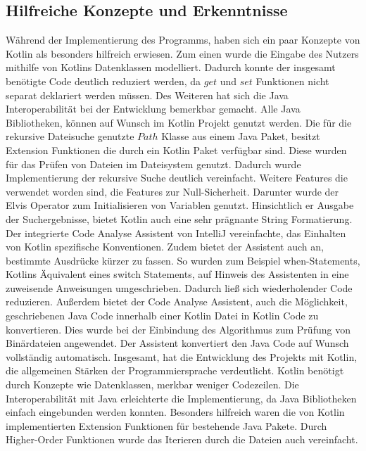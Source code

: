 \documentclass{article}
\begin{document}
\subsection{Hilfreiche Konzepte und Erkenntnisse}
Während der Implementierung des Programms, haben sich ein paar Konzepte von Kotlin als besonders hilfreich erwiesen. Zum einen wurde die Eingabe des Nutzers mithilfe von Kotlins Datenklassen modelliert. Dadurch konnte der insgesamt benötigte Code deutlich reduziert werden, da $get$ und $set$ Funktionen nicht separat deklariert werden müssen. Des Weiteren hat sich die Java Interoperabilität bei der Entwicklung bemerkbar gemacht. Alle Java Bibliotheken, können auf Wunsch im Kotlin Projekt genutzt werden. Die für die rekursive Dateisuche genutzte $Path$ Klasse aus einem Java Paket, besitzt Extension Funktionen die durch ein Kotlin Paket verfügbar sind. Diese wurden für das Prüfen von Dateien im Dateisystem genutzt. Dadurch wurde Implementierung der rekursive Suche deutlich vereinfacht. Weitere Features die verwendet worden sind, die Features zur Null-Sicherheit. Darunter wurde der Elvis Operator zum Initialisieren von Variablen genutzt. Hinsichtlich er Ausgabe der Suchergebnisse, bietet Kotlin auch eine sehr prägnante String Formatierung. \newline
Der integrierte Code Analyse Assistent von IntelliJ vereinfachte, das Einhalten von Kotlin spezifische Konventionen. Zudem bietet der Assistent auch an, bestimmte Ausdrücke kürzer zu fassen. So wurden zum Beispiel when-Statements, Kotlins Äquivalent eines switch Statements, auf Hinweis des Assistenten in eine zuweisende Anweisungen umgeschrieben. Dadurch ließ sich wiederholender Code reduzieren. Außerdem bietet der Code Analyse Assistent, auch die Möglichkeit, geschriebenen Java Code innerhalb einer Kotlin Datei in Kotlin Code zu konvertieren. Dies wurde bei der Einbindung des Algorithmus zum Prüfung von Binärdateien angewendet. Der Assistent konvertiert den Java Code auf Wunsch vollständig automatisch.\newline
Insgesamt, hat die Entwicklung des Projekts mit Kotlin, die allgemeinen Stärken der Programmiersprache verdeutlicht. Kotlin benötigt durch Konzepte wie Datenklassen, merkbar weniger Codezeilen. Die Interoperabilität mit Java erleichterte die Implementierung, da Java Bibliotheken einfach eingebunden werden konnten. Besonders hilfreich waren die von Kotlin implementierten Extension Funktionen für bestehende Java Pakete. Durch Higher-Order Funktionen wurde das Iterieren durch die Dateien auch vereinfacht.
\end{document}
